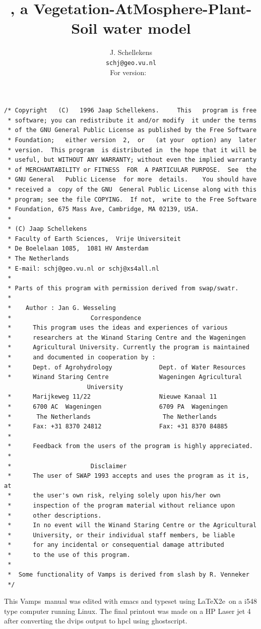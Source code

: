 \documentclass[11pt]{book}
\title{\vamps, a Vegetation-AtMosphere-Plant-Soil water model}
\author{J. Schellekens\\ {\tt schj@geo.vu.nl}\\ 
For version: \vampsversion\ \vampsstatus{}}
\newcommand{\vamps}{{\sf Vamps}}
\begin{document}

\maketitle
{\small
\begin{verbatim}
/* Copyright   (C)   1996 Jaap Schellekens.     This   program is free
 * software; you can redistribute it and/or modify  it under the terms
 * of the GNU General Public License as published by the Free Software
 * Foundation;   either version  2,  or   (at your  option) any  later
 * version.  This program  is distributed in  the hope that it will be
 * useful, but WITHOUT ANY WARRANTY; without even the implied warranty
 * of MERCHANTABILITY or FITNESS  FOR  A PARTICULAR PURPOSE.  See  the
 * GNU General   Public License  for more  details.    You should have
 * received a  copy of the GNU  General Public License along with this
 * program; see the file COPYING.  If not,  write to the Free Software
 * Foundation, 675 Mass Ave, Cambridge, MA 02139, USA.
 *
 * (C) Jaap Schellekens
 * Faculty of Earth Sciences,  Vrije Universiteit
 * De Boelelaan 1085,  1081 HV Amsterdam
 * The Netherlands
 * E-mail: schj@geo.vu.nl or schj@xs4all.nl
 *
 * Parts of this program with permission derived from swap/swatr.
 *
 *    Author : Jan G. Wesseling
 *                      Correspondence
 *      This program uses the ideas and experiences of various
 *      researchers at the Winand Staring Centre and the Wageningen
 *      Agricultural University. Currently the program is maintained
 *      and documented in cooperation by :
 *      Dept. of Agrohydrology             Dept. of Water Resources
 *      Winand Staring Centre              Wageningen Agricultural 
 					   University
 *      Marijkeweg 11/22                   Nieuwe Kanaal 11
 *      6700 AC  Wageningen                6709 PA  Wageningen
 *       The Netherlands                    The Netherlands
 *      Fax: +31 8370 24812                Fax: +31 8370 84885
 *
 *      Feedback from the users of the program is highly appreciated.
 *
 *                      Disclaimer
 *      The user of SWAP 1993 accepts and uses the program as it is, at
 *      the user's own risk, relying solely upon his/her own
 *      inspection of the program material without reliance upon
 *      other descriptions.
 *      In no event will the Winand Staring Centre or the Agricultural 
 *      University, or their individual staff members, be liable 
 *      for any incidental or consequential damage attributed
 *      to the use of this program.  
 *	
 *	Some functionality of Vamps is derived from slash by R. Venneker
 */
\end{verbatim}
}
This \vamps\ manual was edited with emacs and typeset using \LaTeX2e\ on a
i548 type computer running Linux. The final printout was made on a HP
Laser jet 4 after converting the dvips output to hpcl using
ghostscript.
\end{document}

